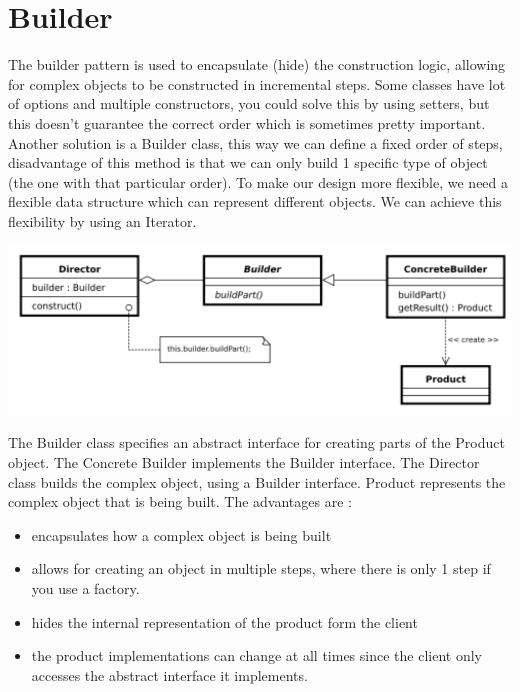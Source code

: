 \documentclass{report}
\begin{document}
	\chapter{Builder}
		The builder pattern is used to encapsulate (hide) the construction logic, allowing for complex objects to be constructed in incremental steps. Some classes have lot of options and multiple constructors, you could solve this by using setters, but this doesn't guarantee the correct order which is sometimes pretty important. Another solution is a Builder class, this way we can define a fixed order of steps, disadvantage of this method is that we can only build 1 specific type of object (the one with that particular order). To make our design more flexible, we need a flexible data structure which can represent different objects. We can achieve this flexibility by using an Iterator.
   		\begin{center}
   			\includegraphics[scale=0.5]{builder}
   		\end{center} 
   		The Builder class specifies an abstract interface for creating parts of the Product object. The Concrete Builder implements the Builder interface. The Director class builds the complex object, using a Builder interface. Product represents the complex object that is being built.
   		The advantages are : 
   		\begin{itemize}
   			\item encapsulates how a complex object is being built 
   			\item allows for creating an object in multiple steps, where there is only 1 step if you use a factory.
   			\item hides the internal representation of the product form the client
   			\item the product implementations can change at all times since the client only accesses the abstract interface it implements.
   		\end{itemize}
\end{document}
